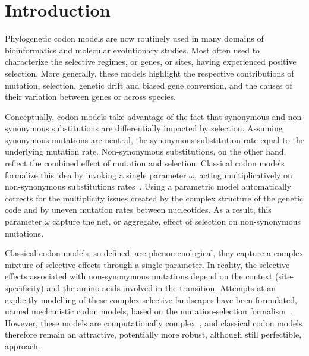 \section{Introduction}

Phylogenetic codon models are now routinely used in many domains of bioinformatics and molecular evolutionary studies.
Most often used to characterize the selective regimes, or genes, or sites, having experienced positive selection.
More generally, these models highlight the respective contributions of mutation, selection, genetic drift and biased gene conversion, and the causes of their variation between genes or across species.

Conceptually, codon models take advantage of the fact that synonymous and non-synonymous substitutions are differentially impacted by selection.
Assuming synonymous mutations are neutral, the synonymous substitution rate equal to the underlying mutation rate.
Non-synonymous substitutions, on the other hand, reflect the combined effect of mutation and selection.
Classical codon models formalize this idea by invoking a single parameter $\omega$, acting multiplicatively on non-synonymous substitutions rates~\citep{Muse1994, Goldman1994}.
Using a parametric model automatically corrects for the multiplicity issues created by the complex structure of the genetic code and by uneven mutation rates between nucleotides.
As a result, this parameter $\omega$ capture the net, or aggregate, effect of selection on non-synonymous mutations.

Classical codon models, so defined, are phenomenological, they capture a complex mixture of selective effects through a single parameter.
In reality, the selective effects associated with non-synonymous mutations depend on the context (site-specificity) and the amino acids involved in the transition.
Attempts at an explicitly modelling of these complex selective landscapes have been formulated, named mechanistic codon models, based on the mutation-selection formalism~\citep{Halpern1998}.
However, these models are computationally complex~\citep{Rodrigue2010, Tamuri2012}, and classical codon models therefore remain an attractive, potentially more robust, although still perfectible, approach.

